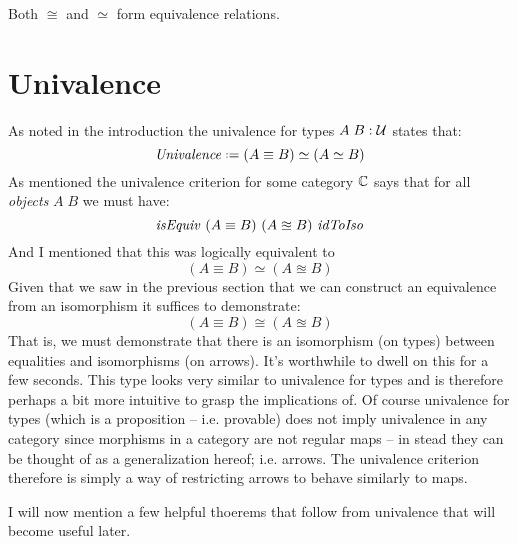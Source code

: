 Both $\cong$ and $\simeq$ form equivalence relations.

\section{Univalence}
\label{univalence}
As noted in the introduction the univalence for types $A\; B \;\mathord{:}\; \mathcal{U}$ states
that:
%
$$
\mathit{Univalence} \defeq (A \equiv B) \simeq (A \simeq B)
$$
%
As mentioned the univalence criterion for some category $\mathbb{C}$ says that for all
\emph{objects} $A\;B$ we must have:
$$
\mathit{isEquiv}\ (A \equiv B)\ (A \approxeq B)\ \mathit{idToIso}
$$
And I mentioned that this was logically equivalent to
%
$$
(A \equiv B) \simeq (A \approxeq B)
$$
%
Given that we saw in the previous section that we can construct an equivalence
from an isomorphism it suffices to demonstrate:
%
$$
(A \equiv B) \cong (A \approxeq B)
$$
%
That is, we must demonstrate that there is an isomorphism (on types) between
equalities and isomorphisms (on arrows). It's worthwhile to dwell on this for a
few seconds. This type looks very similar to univalence for types and is
therefore perhaps a bit more intuitive to grasp the implications of. Of course
univalence for types (which is a proposition -- i.e. provable) does not imply
univalence in any category since morphisms in a category are not regular maps --
in stead they can be thought of as a generalization hereof; i.e. arrows. The
univalence criterion therefore is simply a way of restricting arrows to behave
similarly to maps.

I will now mention a few helpful thoerems that follow from univalence that will
become useful later.


